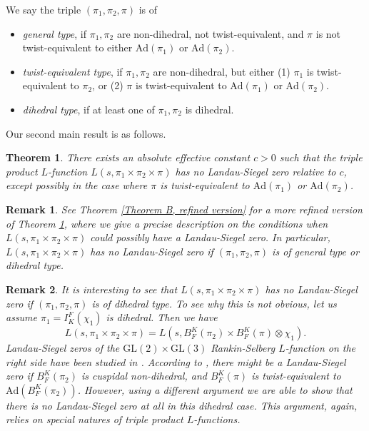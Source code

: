 \documentclass[12pt]{amsart}
\newcommand{\Ad}{\text{Ad}}
\newcommand{\GL}{\text{GL}}
\newtheorem{remark}{Remark}[section]
\newtheorem{thmx}{Theorem}
\begin{document}
We say the triple $(\pi_1,\pi_2,\pi)$ is of 
\begin{itemize}
    \item \textit{general type}, if $\pi_1,\pi_2$ are non-dihedral, not twist-equivalent, and $\pi$ is not twist-equivalent to either $\Ad(\pi_1)$ or $\Ad(\pi_2)$.
    \item \textit{twist-equivalent type}, if $\pi_1,\pi_2$ are non-dihedral, but either (1) $\pi_1$ is twist-equivalent to $\pi_2$, or (2) $\pi$ is twist-equivalent to $\Ad(\pi_1)$ or $\Ad(\pi_2)$.
    \item \textit{dihedral type}, if at least one of $\pi_1,\pi_2$ is dihedral.
\end{itemize}

Our second main result is as follows.

\begin{thmx}\label{Theorem B}
    There exists an absolute effective constant $c>0$ such that the triple product $L$-function $L(s,\pi_1 \times \pi_2 \times \pi)$ has no Landau-Siegel zero relative to $c$, except possibly in the case where $\pi$ is twist-equivalent to $\Ad(\pi_1)$ or $\Ad(\pi_2)$.
\end{thmx}

\begin{remark}
    See Theorem \ref{Theorem B, refined version} for a more refined version of Theorem \ref{Theorem B}, where we give a precise description on the conditions when $L(s,\pi_1 \times \pi_2 \times \pi)$ could possibly have a Landau-Siegel zero. In particular, $L(s,\pi_1 \times \pi_2 \times \pi)$ has no Landau-Siegel zero if $(\pi_1,\pi_2,\pi)$ is of general type or dihedral type.
\end{remark}

\begin{remark}
    It is interesting to see that $L(s,\pi_1 \times \pi_2 \times \pi)$ has no Landau-Siegel zero if $(\pi_1,\pi_2,\pi)$ is of dihedral type. To see why this is not obvious, let us assume $\pi_1 = I_K^F(\chi_1)$ is dihedral. Then we have 
    \begin{equation*}
        L(s,\pi_1 \times \pi_2 \times \pi) = L(s,B_F^K(\pi_2) \times B_F^K(\pi) \otimes \chi_1).
    \end{equation*}
    Landau-Siegel zeros of the $\GL(2) \times \GL(3)$ Rankin-Selberg $L$-function on the right side have been studied in \cite{Luo2023}. According to \cite[Theorem 2]{Luo2023}, there might be a Landau-Siegel zero if $B_F^K(\pi_2)$ is cuspidal non-dihedral, and $B_F^K(\pi)$ is twist-equivalent to $\Ad(B_F^K(\pi_2))$. However, using a different argument we are able to show that there is no Landau-Siegel zero at all in this dihedral case. This argument, again, relies on special natures of triple product $L$-functions.
\end{remark}
\end{document}
